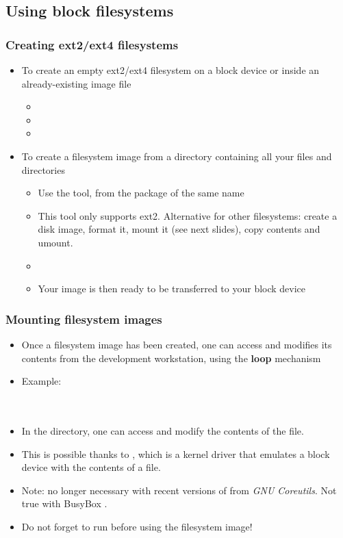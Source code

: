 \subsection{Using block filesystems}

\begin{frame}
  \frametitle{Creating ext2/ext4 filesystems}
  \begin{itemize}
  \item To create an empty ext2/ext4 filesystem on a block device or
    inside an already-existing image file
    \begin{itemize}
    \item {}
    \item {}
    \item {}
    \end{itemize}
  \item To create a filesystem image from a directory containing all
    your files and directories
    \begin{itemize}
    \item Use the  tool, from the package of the same name
    \item This tool only supports ext2. Alternative for other
          filesystems: create a disk image, format it, mount it (see
          next slides), copy contents and umount.
    \item {}
    \item Your image is then ready to be transferred to your block
      device
    \end{itemize}
  \end{itemize}
\end{frame}

\begin{frame}
  \frametitle{Mounting filesystem images}
  \begin{itemize}
  \item Once a filesystem image has been created, one can access and
    modifies its contents from the development workstation, using the
    {\bf loop} mechanism
  \item Example:\\
    \\
    \\
  \item In the  directory, one can access and modify
    the contents of the  file.
  \item This is possible thanks to , which is a kernel
    driver that emulates a block device with the contents of a file.
  \item Note:  no longer necessary with recent versions
        of  from {\em GNU Coreutils}. Not true with BusyBox
       .
  \item Do not forget to run  before using the filesystem
    image!
  \end{itemize}
\end{frame}

